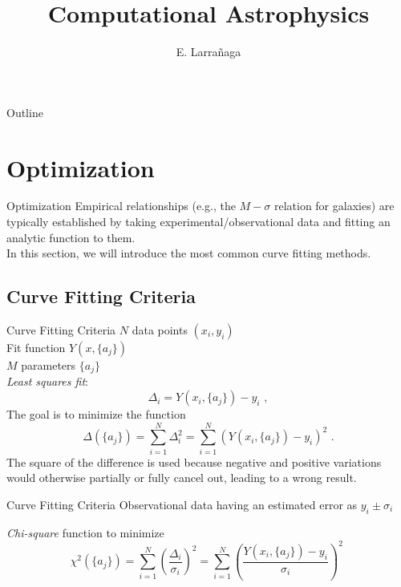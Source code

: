 \documentclass[11pt]{beamer}
\begin{document}
\begin{frame}
\title{Computational Astrophysics}
\author{E. Larrañaga}
\titlepage
\end{frame}

\begin{frame}{Outline}
\tableofcontents
\end{frame}

\section{Optimization}
\begin{frame}[fragile]{Optimization}
Empirical relationships (e.g., the $M-\sigma$ relation for galaxies)
are typically established by taking experimental/observational data
and fitting an analytic function to them. \\

In this section, we will
introduce the most common curve fitting methods. 
\end{frame}

\subsection{Curve Fitting Criteria}

\begin{frame}[fragile]{Curve Fitting Criteria}
$N$ data points $(x_i,y_i)$ \\
Fit function $Y(x,\{a_j\})$ \\
$M$ parameters $\{a_j\}$ \\

\emph{Least squares fit}:\\
\begin{equation}
\Delta_i = Y(x_i,\{a_j\}) - y_i\,\,,
\end{equation}
The goal is to minimize the function
\begin{equation}
\Delta(\{a_j\}) = \sum_{i=1}^N \Delta_i^2 = \sum_{i=1}^N \left( Y(x_i,\{a_j\}) - y_i \right)^2\,\,.
\end{equation}
The square of the difference is used because negative
and positive variations would otherwise partially or fully cancel out, leading to a wrong result. 
\end{frame}

\begin{frame}[fragile]{Curve Fitting Criteria}
Observational data having an estimated error as $y_i \pm \sigma_i$ \\
\bigskip

\emph{Chi-square} function to minimize
\begin{equation}
\chi^2(\{a_j\}) = \sum_{i=1}^N \left(\frac{\Delta_i}{\sigma_i} \right)^2 = 
\sum_{i=1}^N \left( \frac{Y(x_i,\{a_j\}) - y_i}{\sigma_i} \right)^2\,\,
\label{eq:analysis_chi21}
\end{equation}
\end{frame}
\end{document}

